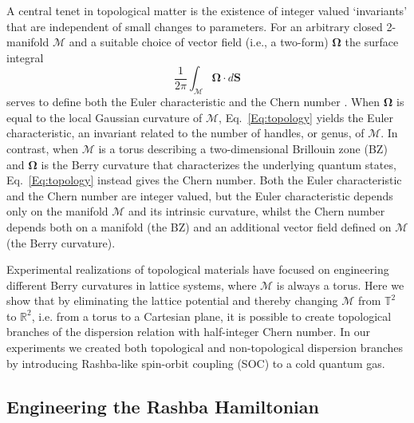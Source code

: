 A central tenet in topological matter is the existence of integer valued `invariants' that are independent of small changes to parameters. For an arbitrary closed 2-manifold $\mathcal{M}$ and a suitable choice of vector field (i.e., a two-form) $\mathbf{\Omega}$ the surface integral
%
\begin{equation}
	\frac{1}{2\pi}\int_{\mathcal{M}}\mathbf \Omega\cdot d\mathbf S
	\label{Eq:topology}
\end{equation}
%
serves to define both the Euler characteristic and the Chern number \cite{ozawa_topological_2019,cooper_topological_2019}. When $\mathbf{\Omega}$ is equal to the local Gaussian curvature of $\mathcal{M}$, Eq.~\ref{Eq:topology} yields the Euler characteristic, an invariant related to the number of handles, or genus, of $\mathcal{M}$. In contrast, when $\mathcal{M}$ is a torus describing a two-dimensional Brillouin zone (BZ) and $\mathbf{\Omega}$ is the Berry curvature that characterizes the underlying quantum states, Eq.~\ref{Eq:topology} instead gives the Chern number. Both the Euler characteristic and the Chern number are integer valued, but the Euler characteristic depends only on the manifold $\mathcal{M}$ and its intrinsic curvature, whilst the Chern number depends both on a manifold (the BZ) and an additional vector field defined on $\mathcal{M}$ (the Berry curvature). 


Experimental realizations of topological materials have focused on engineering different Berry curvatures in lattice systems, where $\mathcal{M}$ is always a torus. Here we show that by eliminating the lattice potential and thereby changing  $\mathcal{M}$ from ${\mathbb T}^2$ to ${\mathbb R}^2$, i.e. from a torus to a Cartesian plane, it is possible to create topological branches of the dispersion relation with half-integer Chern number. In our experiments we created both topological and non-topological dispersion branches by introducing Rashba-like spin-orbit coupling (SOC)\cite{campbell_realistic_2011, huang_experimental_2016, meng_experimental_2016} to a cold quantum gas. 

\subsection{Engineering the Rashba Hamiltonian}

